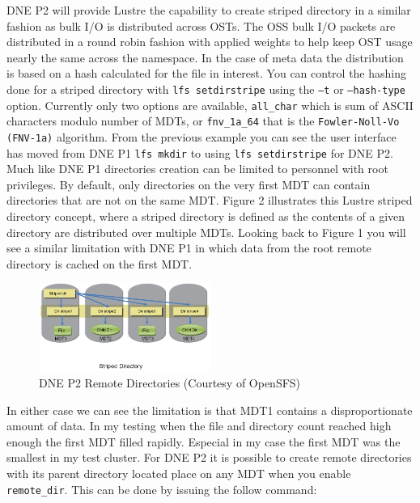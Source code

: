 \documentclass[conference,compsoc]{IEEEtran}
\begin{document}
DNE P2 will provide Lustre the capability to create striped directory in a
similar fashion as bulk I/O is distributed across OSTs. The OSS bulk I/O
packets are distributed in a round robin fashion with applied weights to help
keep OST usage nearly the same across the namespace. In the case of meta data
the distribution is based on a hash calculated for the file in interest. You
can control the hashing done for a striped directory with
{\footnotesize{\texttt{lfs setdirstripe}}} using the
{\footnotesize{\texttt{–t}}} or {\footnotesize{\texttt{--hash-type}}} option.
Currently only two options are available, {\footnotesize{\texttt{all\_char}}}
which is sum of ASCII characters modulo number of MDTs, or
{\footnotesize{\texttt{fnv\_1a\_64}}} that is the
{\footnotesize{\texttt{Fowler-Noll-Vo (FNV-1a)}}} algorithm. From the previous
example you can see the user interface has moved from DNE P1
{\footnotesize{\texttt{lfs mkdir}}} to using {\footnotesize{\texttt{lfs
setdirstripe}}}  for DNE P2. Much like DNE P1 directories creation can be
limited to personnel with root privileges. By default, only directories on the
very first MDT can contain directories that are not on the same MDT. Figure 2
illustrates this Lustre striped directory concept, where a striped directory is
defined as the contents of a given directory are distributed over multiple
MDTs.  Looking back to Figure 1 you will see a similar limitation with DNE P1
in which data from the root remote directory is cached on the first MDT.  

\begin{figure}[!ht]
  \centering
    \includegraphics[width=0.5\textwidth]{figs/dnep2}
  \caption{DNE P2 Remote Directories (Courtesy of OpenSFS)}
\end{figure}

In either case we can see the limitation is that MDT1 contains a
disproportionate amount of data. In my testing when the file and directory
count reached high enough the first MDT filled rapidly. Especial in my case the
first MDT was the smallest in my test cluster. For DNE P2 it is possible to
create remote directories with its parent directory located place on any MDT
when you enable {\footnotesize{\texttt{remote\_dir}}}. This can be done by issuing the follow command:
\end{document}
